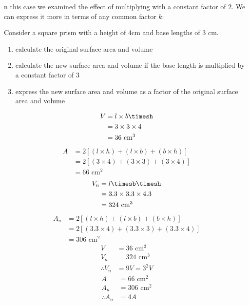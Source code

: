 n this case we examined the effect of multiplying with a constant factor of $2$. We can express
it more in terms of any common factor $k$:
\begin{wex}{}
 {
Consider a square prism with a height of 4cm and base lengths of $3$ cm.

\begin{enumerate}[noitemsep, label=\textbf{\arabic*}. ] 
 \item calculate the original surface area and volume
\item calculate the new surface area and volume if the base length is multiplied by a constant factor of $3$
\item express the new surface area and volume as a factor of the original surface area and volume
\end{enumerate}
}
{
\begin{align*}
V&=l\times b\timesh\\
&=3\times3\times4\\
&= 36\mbox{ cm}^3
\end{align*}
\begin{align*}
A &= 2[(l \times h) + (l \times b) + (b \times h)]\\
&= 2[(3 \times 4) + (3 \times 3) + (3 \times 4)]\\
&= 66 \mbox{ cm}^2
\end{align*}
\begin{align*}
V_n&=l\timesb\timesh\\
&=3.3\times3.3\times4.3\\
&= 324\mbox{ cm}^3
\end{align*}
\begin{align*}
A_n &= 2[(l \times h) + (l \times b) + (b \times h)]\\
&= 2[(3.3 \times 4) + (3.3 \times 3) + (3.3 \times 4)]\\
&= 306 \mbox{ cm}^2
\end{align*}
\begin{align*}
V&=36\mbox{ cm}^3\\
V_n&= 324\mbox{ cm}^3\\
\therefore V_n&=9V=3^{2}V
\end{align*}
\begin{align*}
A &= 66 \mbox{ cm}^2\\
A_n&= 306\mbox{ cm}^2\\
\therefore A_n&= 4A
\end{align*}
}
\end{wex}

